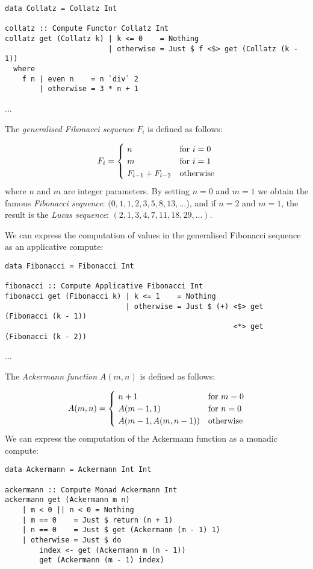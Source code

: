 \begin{verbatim}
data Collatz = Collatz Int

collatz :: Compute Functor Collatz Int
collatz get (Collatz k) | k <= 0    = Nothing
                        | otherwise = Just $ f <$> get (Collatz (k - 1))
  where
    f n | even n    = n `div` 2
        | otherwise = 3 * n + 1
\end{verbatim}

...

The \emph{generalised Fibonacci sequence} $F_i$ is defined as follows:

\[
F_{i} = {\begin{cases}~n&{\text{for }}i=0\\~m&{\text{for }}i=1\\~F_{i-1}+F_{i-2}&{\text{otherwise}}\end{cases}}
\vspace{2mm}
\]
\noindent
where $n$ and $m$ are integer parameters. By setting $n=0$ and $m=1$ we obtain
the famous \emph{Fibonacci sequence}: $(0, 1, 1, 2, 3, 5, 8, 13, \dots$), and if
$n=2$ and $m=1$, the result is the \emph{Lucas sequence}:
$(2, 1, 3, 4, 7, 11, 18, 29, \dots)$.

We can express the computation of values in the generalised Fibonacci sequence
as an applicative compute:

\begin{verbatim}
data Fibonacci = Fibonacci Int

fibonacci :: Compute Applicative Fibonacci Int
fibonacci get (Fibonacci k) | k <= 1    = Nothing
                            | otherwise = Just $ (+) <$> get (Fibonacci (k - 1))
                                                     <*> get (Fibonacci (k - 2))
\end{verbatim}

...

The \emph{Ackermann function} $A(m, n)$ is defined as follows:

\[
A(m, n) = {\begin{cases}~n+1&{\text{for }}m=0\\~A(m-1, 1)&{\text{for }}n=0\\~A(m-1,A(m,n-1))&{\text{otherwise}}\end{cases}}
\vspace{2mm}
\]
\noindent
We can express the computation of the Ackermann function as a monadic compute:

\begin{verbatim}
data Ackermann = Ackermann Int Int

ackermann :: Compute Monad Ackermann Int
ackermann get (Ackermann m n)
    | m < 0 || n < 0 = Nothing
    | m == 0    = Just $ return (n + 1)
    | n == 0    = Just $ get (Ackermann (m - 1) 1)
    | otherwise = Just $ do
        index <- get (Ackermann m (n - 1))
        get (Ackermann (m - 1) index)
\end{verbatim}


